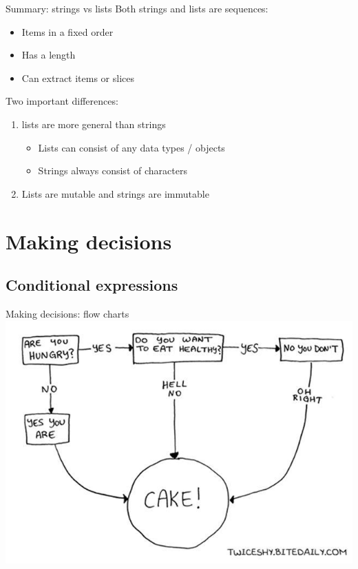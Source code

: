 \documentclass[aspectratio=169,usenames,dvipsnames]{beamer}
\begin{document}
\begin{frame}[fragile]{Summary: strings vs lists}
Both strings and lists are sequences:
    \begin{itemize}
        \item Items in a fixed order
        \item Has a length
        \item Can extract items or slices
    \end{itemize}

Two important differences:
\begin{enumerate}
    \item lists are more general than strings
        \begin{itemize}
            \item Lists can consist of any data types / objects
            \item Strings always consist of characters
        \end{itemize}
    \item Lists are mutable and strings are immutable
\end{enumerate}

\end{frame}







\section{Making decisions}
\subsection{Conditional expressions}
\frame{\tableofcontents[currentsubsection]}

\begin{frame}{Making decisions: flow charts}
    \includegraphics[height=0.8\textheight]{fig/flowchart}
\end{frame}
\end{document}
